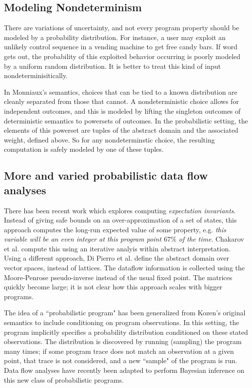 \subsection{Modeling Nondeterminism}

There are variations of uncertainty,
and not every program property should be modeled by a
probability distribution.
For instance, a user may exploit an unlikely control sequence
in a vending machine to get free candy bars. 
If word gets out, the probability of
this exploited behavior occurring is poorly modeled by a uniform 
random distribution.
It is better to treat this kind of input nondeterminisitically.

In Monniaux's semantics, choices that can be tied to a known
distribution are cleanly separated from those that cannot.
A nondeterministic choice allows for independent outcomes, and
this is modeled by lifting the singleton outcomes of deterministic
semantics to powersets of outcomes.
In the probabilistic setting, the elements of this powerset are
tuples of the abstract domain and the associated weight, defined
above.
So for any nondeterminstic choice, the resulting computation 
is safely modeled by one of these tuples.

\subsection{More and varied probabilistic data flow analyses}

There has been recent work which explores computing {\sl expectation
invariants}.
Instead of giving safe bounds on an over-approximation of a set
of states, this approach computes the long-run expected value of
some property, e.g. 
{\sl this variable will be an even integer at this program point
$67\%$ of the time}.
Chakarov et al. compute this using an iterative analyis within
abstract interpretation.
Using a different approach, Di Pierro et al. define the abstract 
domain over vector spaces, instead of lattices.
The dataflow information is collected using the Moore-Penrose
pseudo-inverse instead of the usual fixed point.
The matrices quickly become large; it is not clear how this
approach scales with bigger programs.

The idea of a ``probabilistic program" has been generalized from
Kozen's original semantics to include conditioning on program
observations.
In this setting, the program implicitly specifies a probability 
distribution conditioned on these stated observations.
The distribution is discovered by running (sampling) the program many
times; if some program trace does not match an observation
at a given point, that trace is not considered, and a new ``sample"
of the program is run. 
Data flow analyses have recently been adapted to perform Bayesian
inference on this new class of probabilistic programs.

